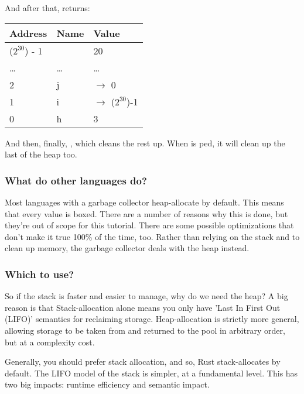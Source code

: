 And after that,  returns:

\begin{table}[H]
  \begin{tabular}{|l|l|l|}
    \hline
    \textbf{Address} & \textbf{Name} & \textbf{Value} \\
    \hline
    ($2^{30}$) - 1 & & 20 \\
    \hline
    \ldots & \ldots & \ldots \\
    \hline
    2 & j & $\rightarrow$ 0 \\
    \hline
    1 & i & $\rightarrow$ ($2^{30}$)-1 \\
    \hline
    0 & h & 3 \\
    \hline
  \end{tabular}
\end{table}

And then, finally, , which cleans the rest up. When  is ped, it will clean up the last of the heap too.

\subsubsection*{What do other languages do?}

Most languages with a garbage collector heap-allocate by default. This means that every value is boxed. There are a number of reasons 
why this is done, but they're out of scope for this tutorial. There are some possible optimizations that don't make it true 100\% of 
the time, too. Rather than relying on the stack and  to clean up memory, the garbage collector deals with the heap instead.

\subsubsection*{Which to use?}

So if the stack is faster and easier to manage, why do we need the heap? A big reason is that Stack-allocation alone means you only 
have 'Last In First Out (LIFO)' semantics for reclaiming storage. Heap-allocation is strictly more general, allowing storage to be 
taken from and returned to the pool in arbitrary order, but at a complexity cost.


Generally, you should prefer stack allocation, and so, Rust stack-allocates by default. The LIFO model of the stack is simpler, 
at a fundamental level. This has two big impacts: runtime efficiency and semantic impact.

